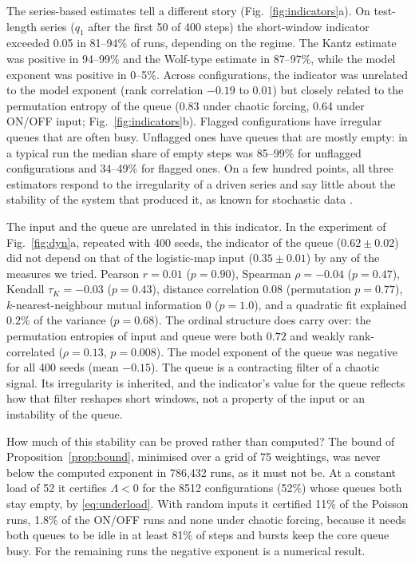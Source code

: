 \documentclass[11pt,a4paper]{article}
\begin{document}
The series-based estimates tell a different story (Fig.~\ref{fig:indicators}a). On test-length series ($q_1$ after the first 50 of 400 steps) the short-window indicator exceeded 0.05 in 81--94\% of runs, depending on the regime. The Kantz estimate \citep{kantz1994robust} was positive in 94--99\% and the Wolf-type estimate \citep{wolf1985determining} in 87--97\%, while the model exponent was positive in 0--5\%. Across configurations, the indicator was unrelated to the model exponent (rank correlation $-0.19$ to $0.01$) but closely related to the permutation entropy of the queue (0.83 under chaotic forcing, 0.64 under ON/OFF input; Fig.~\ref{fig:indicators}b). Flagged configurations have irregular queues that are often busy. Unflagged ones have queues that are mostly empty: in a typical run the median share of empty steps was 85--99\% for unflagged configurations and 34--49\% for flagged ones. On a few hundred points, all three estimators respond to the irregularity of a driven series and say little about the stability of the system that produced it, as known for stochastic data \citep{dammig1993estimation}.

The input and the queue are unrelated in this indicator. In the experiment of Fig.~\ref{fig:dyn}a, repeated with 400 seeds, the indicator of the queue ($0.62\pm0.02$) did not depend on that of the logistic-map input ($0.35\pm0.01$) by any of the measures we tried. Pearson $r=0.01$ ($p=0.90$), Spearman $\rho=-0.04$ ($p=0.47$), Kendall $\tau_K=-0.03$ ($p=0.43$), distance correlation $0.08$ (permutation $p=0.77$), $k$-nearest-neighbour mutual information $0$ ($p=1.0$), and a quadratic fit explained $0.2\%$ of the variance ($p=0.68$). The ordinal structure does carry over: the permutation entropies of input and queue were both $0.72$ and weakly rank-correlated ($\rho=0.13$, $p=0.008$). The model exponent of the queue was negative for all 400 seeds (mean $-0.15$). The queue is a contracting filter of a chaotic signal. Its irregularity is inherited, and the indicator's value for the queue reflects how that filter reshapes short windows, not a property of the input or an instability of the queue.

How much of this stability can be proved rather than computed? The bound of Proposition~\ref{prop:bound}, minimised over a grid of 75 weightings, was never below the computed exponent in 786,432 runs, as it must not be. At a constant load of 52 it certifies $\Lambda<0$ for the 8512 configurations (52\%) whose queues both stay empty, by \eqref{eq:underload}. With random inputs it certified 11\% of the Poisson runs, 1.8\% of the ON/OFF runs and none under chaotic forcing, because it needs both queues to be idle in at least 81\% of steps and bursts keep the core queue busy. For the remaining runs the negative exponent is a numerical result.
\end{document}

